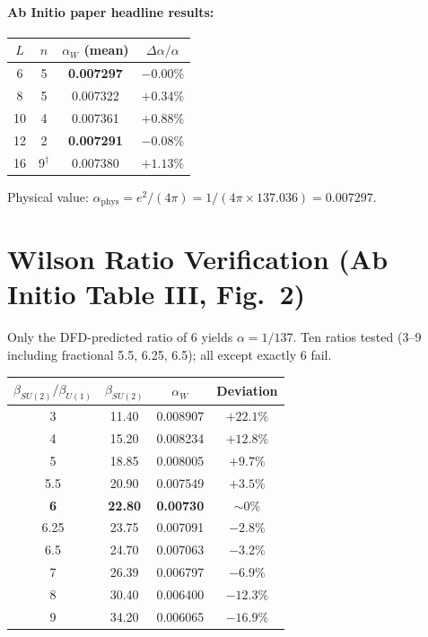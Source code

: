 \documentclass[11pt]{article}
\begin{document}
\paragraph{Ab Initio paper headline results:}

\begin{center}
\begin{tabular}{cccc}
\toprule
$L$ & $n$ & $\alpha_W$ (mean) & $\Delta\alpha/\alpha$ \\
\midrule
6 & 5 & \textbf{0.007297} & $-0.00\%$ \\
8 & 5 & 0.007322 & $+0.34\%$ \\
10 & 4 & 0.007361 & $+0.88\%$ \\
12 & 2 & \textbf{0.007291} & $-0.08\%$ \\
16 & 9$^\dagger$ & 0.007380 & $+1.13\%$ \\
\bottomrule
\end{tabular}
\end{center}

Physical value: $\alpha_{\mathrm{phys}} = e^2/(4\pi) = 1/(4\pi \times 137.036) = 0.007297$.

\section{Wilson Ratio Verification (Ab Initio Table III, Fig.~2)}

Only the DFD-predicted ratio of 6 yields $\alpha = 1/137$. Ten ratios tested (3--9
including fractional 5.5, 6.25, 6.5); all except exactly 6 fail.

\begin{center}
\begin{tabular}{cccc}
\toprule
$\beta_{SU(2)}/\beta_{U(1)}$ & $\beta_{SU(2)}$ & $\alpha_W$ & Deviation \\
\midrule
3 & 11.40 & 0.008907 & $+22.1\%$ \\
4 & 15.20 & 0.008234 & $+12.8\%$ \\
5 & 18.85 & 0.008005 & $+9.7\%$ \\
5.5 & 20.90 & 0.007549 & $+3.5\%$ \\
\textbf{6} & \textbf{22.80} & \textbf{0.00730} & $\sim 0\%$ \\
6.25 & 23.75 & 0.007091 & $-2.8\%$ \\
6.5 & 24.70 & 0.007063 & $-3.2\%$ \\
7 & 26.39 & 0.006797 & $-6.9\%$ \\
8 & 30.40 & 0.006400 & $-12.3\%$ \\
9 & 34.20 & 0.006065 & $-16.9\%$ \\
\bottomrule
\end{tabular}
\end{center}
\end{document}

